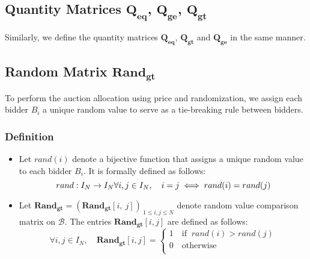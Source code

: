 
\subsection{Quantity Matrices $\mathbf{Q_{eq}}$, $\mathbf{Q_{ge}}$, $\mathbf{Q_{gt}}$}
Similarly, we define the quantity matrices $\mathbf{Q_{eq}}$, $\mathbf{Q_{gt}}$ and $\mathbf{Q_{ge}}$ in the same manner.


\subsection{Random Matrix $\mathbf{Rand_{gt}}$}

To perform the auction allocation using price and randomization, we assign each bidder $B_i$ a unique random value to serve as a tie-breaking rule between bidders.

\subsubsection{Definition}

\begin{itemize}
\item Let $rand(i)$ denote a bijective function that assigns a unique random value to each bidder $B_i$. It is formally defined as follows:
\begin{equation*}
    rand: I_N \to I_N \\
    \forall i,j \in I_N, \quad i = j \iff rand(i) = rand(j)
\end{equation*}

\item Let $\mathbf{Rand_{gt}} = (\mathbf{Rand_{gt}}[i, \ j])_{\ 1 \le i, j \le N}$ denote random value comparison matrix on $\mathcal{B}$. The entries $\mathbf{Rand_{gt}}[i, j]$ are defined as follows:
\begin{equation*}
    \forall i,j \in I_N, \quad \mathbf{Rand_{gt}}[i, j] = 
    \begin{cases}
        1  \quad \text{if } \ rand(i) > rand(j) \\
        0  \quad \text{otherwise} \\
    \end{cases}
\end{equation*}
\end{itemize}

